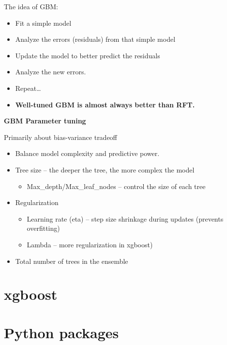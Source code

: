 \documentclass[fontset=fandol,zihao=false,scheme=chinese,heading=true,UTF8]{ctexbook}
\providecommand{\tightlist}{%
  \setlength{\itemsep}{0pt}\setlength{\parskip}{0pt}}
\begin{document}
The idea of GBM:

\begin{itemize}
\tightlist
\item
  Fit a simple model
\item
  Analyze the errors (residuals) from that simple model
\item
  Update the model to better predict the residuals
\item
  Analyze the new errors.
\item
  Repeat\ldots{}
\item
  \textbf{Well-tuned GBM is almost always better than RFT.}
\end{itemize}

\textbf{GBM Parameter tuning}

Primarily about bias-variance tradeoff

\begin{itemize}
\tightlist
\item
  Balance model complexity and predictive power.
\item
  Tree size -- the deeper the tree, the more complex the model

  \begin{itemize}
  \tightlist
  \item
    Max\_depth/Max\_leaf\_nodes -- control the size of each tree
  \end{itemize}
\item
  Regularization

  \begin{itemize}
  \tightlist
  \item
    Learning rate (eta) -- step size shrinkage during updates (prevents overfitting)
  \item
    Lambda -- more regularization in xgboost)
  \end{itemize}
\item
  Total number of trees in the ensemble
\end{itemize}

\hypertarget{xgboost}{%
\section{xgboost}\label{xgboost}}

\hypertarget{python-packages}{%
\section{Python packages}\label{python-packages}}
\end{document}
